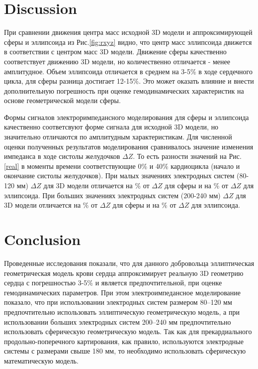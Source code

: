 \documentclass[conference]{IEEEtran}
\begin{document}
\section{Discussion}

При сравнении движения центра масс исходной 3D модели и аппроксимирующей сферы и эллипсоида из Рис.\ref{fig:rxyz} видно,
что центр масс эллипсоида движется в соответствии с центром масс 3D модели.
Движение сферы качественно соответствует движению 3D модели, но количественно отличается - менее амплитудное.
Объем эллипсоида отличается в среднем на 3-5\% в ходе сердечного цикла, для сферы разница достигает 12-15\%.
Это может оказать влияние и внести дополнительную погрешность при оценке гемодинамических характеристик на основе геометрической модели сферы.

Формы сигналов электроримпедансного моделирования для сферы и эллипсоида качественно соответсвуют форме сигнала для исходной 3D модели, но значительно отличаются по амплитудным характеристикам.
Для численной оценки полученных результатов моделирования сравнивалось значение изменения импеданса в ходе систолы желудочков $\Delta Z$.
То есть разности значений  на Рис.\ref{real}  в моменты времени соответствующие 0\% и 40\% кардиоцикла (начало и окончание систолы желудочков).
При малых значениях электродных систем (80-120 мм) $\Delta Z$ для 3D модели отличается на \%  от $\Delta Z$ для сферы и на \% от $\Delta Z$ для эллипсоида.
При больших значениях электродных систем (200-240 мм) $\Delta Z$ для 3D модели отличается на \%  от $\Delta Z$ для сферы и на \% от $\Delta Z$ для эллипсоида.

\section{Conclusion}

Проведенные исследования показали, что для данного добровольца эллиптическая геометрическая модель крови сердца аппроксимирует реальную 3D геометрию сердца с погрешностью 3-5\% и является предпочтительной, при оценке гемодинамических параметров.
При этом электроимпедансное моделирование показало, что при использовании электродных систем размером 80--120 мм предпочтительно использовать эллиптическую геометрическую модель, а при использовании больших электродных систем 200--240 мм предпочтительно использовать сферическую геометрическую модель.
Так как для прекардиального продольно-поперечного картирования, как правило, используются электродные системы с размерами свыше 180 мм, то необходимо использовать сферическую математическую модель.
\end{document}
